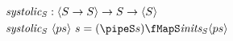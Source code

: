 \documentclass[preview]{standalone}
\begin{document}
\begin{align*}%
    \mathit{systolic_S} &: \vect{S \rightarrow S} \rightarrow S \rightarrow \vect{S}\\
    \mathit{systolic_S} &\ \vect{ps}\ s = (\pipeS s) \fMapS \mathit{inits_S} \vect{ps}%
\end{align*}
\end{document}
